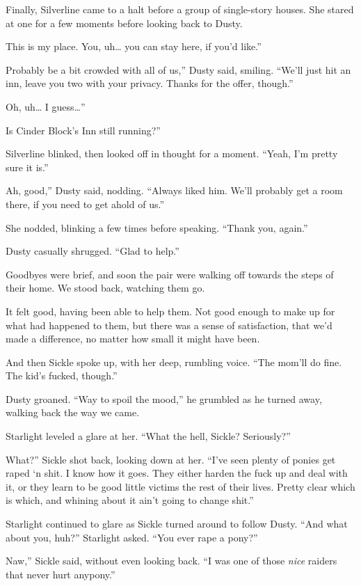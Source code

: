 Finally, Silverline came to a halt before a group of single-story houses. She stared at one for a few moments before looking back to Dusty.

\leavevmode{}This is my place. You, uh… you can stay here, if you’d like.”

\leavevmode{}Probably be a bit crowded with all of us,” Dusty said, smiling. “We’ll just hit an inn, leave you two with your privacy. Thanks for the offer, though.”

\leavevmode{}Oh, uh… I guess…”

\leavevmode{}Is Cinder Block’s Inn still running?”

Silverline blinked, then looked off in thought for a moment. “Yeah, I’m pretty sure it is.”

\leavevmode{}Ah, good,” Dusty said, nodding. “Always liked him. We’ll probably get a room there, if you need to get ahold of us.”

She nodded, blinking a few times before speaking. “Thank you, again.”

Dusty casually shrugged. “Glad to help.”

Goodbyes were brief, and soon the pair were walking off towards the steps of their home. We stood back, watching them go.

It felt good, having been able to help them. Not good enough to make up for what had happened to them, but there was a sense of satisfaction, that we’d made a difference, no matter how small it might have been.

And then Sickle spoke up, with her deep, rumbling voice. “The mom’ll do fine. The kid’s fucked, though.”

Dusty groaned. “Way to spoil the mood,” he grumbled as he turned away, walking back the way we came.

Starlight leveled a glare at her. “What the hell, Sickle? Seriously?”

\leavevmode{}What?” Sickle shot back, looking down at her. “I’ve seen plenty of ponies get raped ‘n shit. I know how it goes. They either harden the fuck up and deal with it, or they learn to be good little victims the rest of their lives. Pretty clear which is which, and whining about it ain’t going to change shit.”

Starlight continued to glare as Sickle turned around to follow Dusty. “And what about you, huh?” Starlight asked. “You ever rape a pony?”

\leavevmode{}Naw,” Sickle said, without even looking back. “I was one of those \textit{nice} raiders that never hurt anypony.”

